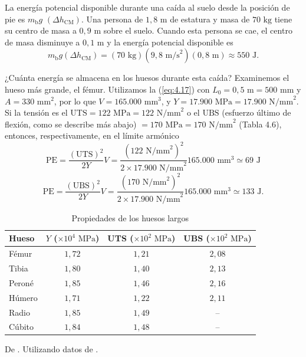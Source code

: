 \documentclass[12pt]{book}
\begin{document}
La energía potencial disponible durante una caída al suelo desde la posición de pie es $m_{\text{b}}g$ $(\Delta h_{\text{CM}})$. Una persona de $1,8\text{ m}$ de estatura y masa de $70\text{ kg}$ tiene su centro de masa a $0,9\text{ m}$ sobre el suelo. Cuando esta persona se cae, el centro de masa disminuye a $0,1\text{ m}$ y la energía potencial disponible es
\[ m_{\text{b}}g(\Delta h_{\text{CM}}) = (70\text{ kg})(9,8\text{ m/s}^2)(0,8\text{ m}) \approx 550\text{ J}. \]

¿Cuánta energía se almacena en los huesos durante esta caída? Examinemos el hueso más grande, el fémur. Utilizamos la (\ref{eq:4.17}) con $L_0 = 0,5\text{ m} = 500\text{ mm}$ y $A = 330\text{ mm}^2$, por lo que $V = 165.000\text{ mm}^3$, y $Y = 17.900\text{ MPa} = 17.900\text{ N/mm}^2$. Si la tensión es el $\text{UTS} = 122\text{ MPa} = 122\text{ N/mm}^2$ o el $\text{UBS}$ (esfuerzo último de flexión, como se describe más abajo) $= 170\text{ MPa} = 170\text{ N/mm}^2$ (Tabla 4.6), entonces, respectivamente, en el límite armónico
\begin{equation}
\text{PE} = \frac{(\text{UTS})^2}{2Y} V = \frac{(122\text{ N/mm}^2)^2}{2 \times 17.900\text{ N/mm}^2} 165.000\text{ mm}^3 \simeq 69\text{ J}
\label{eq:4.78}
\end{equation}
\begin{equation}
\text{PE} = \frac{(\text{UBS})^2}{2Y} V = \frac{(170\text{ N/mm}^2)^2}{2 \times 17.900\text{ N/mm}^2} 165.000\text{ mm}^3 \simeq 133\text{ J}.
\label{eq:4.79}
\end{equation}

\begin{table}[htbp]
\centering
\caption{Propiedades de los huesos largos}
\label{tab:46}
\begin{tabularx}{\textwidth}{Xccc}
\toprule
\textbf{Hueso} & \textbf{$Y$ ($\times 10^4\text{ MPa}$)} & \textbf{UTS ($\times 10^2\text{ MPa}$)} & \textbf{UBS ($\times 10^2\text{ MPa}$)} \\
\midrule
Fémur & $1,72$ & $1,21$ & $2,08$ \\
Tibia & $1,80$ & $1,40$ & $2,13$ \\
Peroné & $1,85$ & $1,46$ & $2,16$ \\
Húmero & $1,71$ & $1,22$ & $2,11$ \\
Radio & $1,85$ & $1,49$ & -- \\
Cúbito & $1,84$ & $1,48$ & -- \\
\bottomrule
\end{tabularx}
\begin{flushleft}
    \small De \cite{6}. Utilizando datos de \cite{79}.
\end{flushleft}
\end{table}
\end{document}
